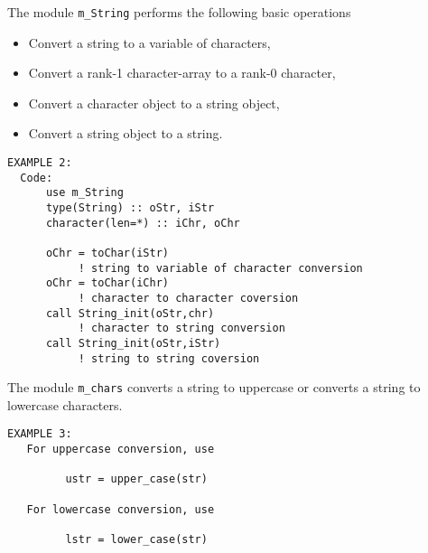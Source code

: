\noindent
The module {\tt m\_String} performs the following basic operations
%
\begin{itemize}
\item Convert a string to a variable of characters,
\item Convert a rank-1 character-array to a rank-0 character,
\item Convert a character object to a string object,
\item Convert a string object to a string.
\end{itemize}
 
\begin{verbatim}
EXAMPLE 2:
  Code:
      use m_String
      type(String) :: oStr, iStr
      character(len=*) :: iChr, oChr

      oChr = toChar(iStr)
           ! string to variable of character conversion
      oChr = toChar(iChr)
           ! character to character coversion
      call String_init(oStr,chr)
           ! character to string conversion
      call String_init(oStr,iStr)  
           ! string to string coversion
\end{verbatim}

\noindent
The module {\tt m\_chars} converts a string to uppercase or converts a string
to lowercase characters.

\begin{verbatim}
EXAMPLE 3:
   For uppercase conversion, use

         ustr = upper_case(str)

   For lowercase conversion, use

         lstr = lower_case(str)
\end{verbatim}
% 
